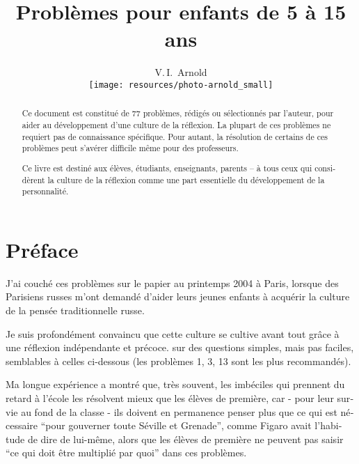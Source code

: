 
\setdefaultlanguage{french}

\title{Problèmes pour enfants de 5 à 15 ans}

\author{V.\,I.~Arnold
\vspace*{2cm}\\
\texttt{[image: resources/photo-arnold\_small]}
}
\date{}


\maketitle
\thispagestyle{empty}
\cleardoublepage
\setcounter{page}{1}
\begin{abstract}
Ce document est constitué de 77 problèmes, rédigés ou sélectionnés par l'auteur, pour aider au développement d'une culture de la réflexion.
La plupart de ces problèmes ne requiert pas de connaissance spécifique.
Pour autant, la résolution de certains de ces problèmes peut s'avérer difficile même pour des professeurs.

Ce livre est destiné aux élèves, étudiants, enseignants, parents -- à tous ceux qui considèrent la culture de la réflexion comme une part essentielle du développement de la personnalité.
\end{abstract}
\clearpage

\section*{Préface}
J'ai couché ces problèmes sur le papier au printemps 2004 à Paris, lorsque des Parisiens russes m'ont demandé d'aider
leurs jeunes enfants à acquérir la culture de la pensée traditionnelle russe.

Je suis profondément convaincu que cette culture se cultive avant tout grâce à une réflexion indépendante et précoce.
sur des questions simples, mais pas faciles, semblables à celles ci-dessous (les problèmes 1, 3, 13 sont les plus recommandés).

Ma longue expérience a montré que, très souvent, les imbéciles qui prennent du retard à l'école les résolvent
mieux que les élèves de première, car - pour leur survie au fond de la classe - ils doivent en permanence
penser plus que ce qui est nécessaire \enquote{pour gouverner toute Séville et Grenade}, comme Figaro avait l'habitude de dire de lui-même, alors que les élèves de première ne peuvent pas saisir \enquote{ce qui doit être multiplié par quoi} dans ces problèmes.


